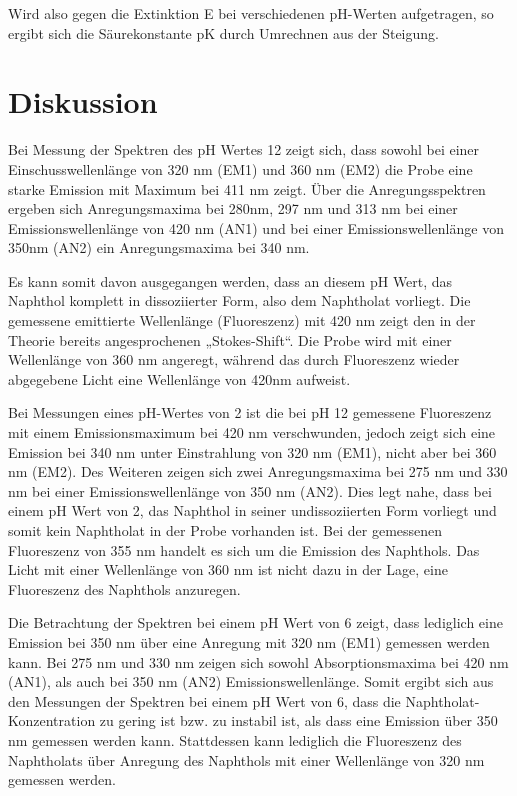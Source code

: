 \documentclass[12pt]{article}
\begin{document}
Wird also gegen die Extinktion E bei verschiedenen pH-Werten aufgetragen,
so ergibt sich die Säurekonstante pK durch Umrechnen aus der Steigung. 

\section{Diskussion}

Bei Messung der Spektren des pH Wertes 12 zeigt sich, dass sowohl bei einer Einschusswellenlänge von 320 nm (EM1) und
360 nm (EM2) die Probe eine starke Emission mit Maximum bei 411 nm zeigt. Über die Anregungsspektren
ergeben sich Anregungsmaxima bei 280nm, 297 nm und 313 nm bei einer Emissionswellenlänge von 420 nm (AN1)
und bei einer Emissionswellenlänge von 350nm (AN2) ein Anregungsmaxima bei 340 nm.

Es kann somit davon ausgegangen werden, dass an diesem pH Wert, das Naphthol komplett in dissoziierter Form, also dem Naphtholat vorliegt.
Die gemessene emittierte Wellenlänge (Fluoreszenz) mit 420 nm zeigt den in der Theorie bereits angesprochenen „Stokes-Shift“.
Die Probe wird mit einer Wellenlänge von 360 nm angeregt, während das durch Fluoreszenz wieder abgegebene
Licht eine Wellenlänge von 420nm aufweist.


Bei Messungen eines pH-Wertes von 2 ist die bei pH 12 gemessene Fluoreszenz mit einem Emissionsmaximum bei 420 nm verschwunden,
jedoch zeigt sich eine Emission bei 340 nm unter Einstrahlung von 320 nm (EM1), nicht aber bei 360 nm (EM2).
Des Weiteren zeigen sich zwei Anregungsmaxima bei 275 nm und 330 nm bei einer Emissionswellenlänge von 350 nm (AN2).
Dies legt nahe, dass bei einem pH Wert von 2, das Naphthol in seiner undissoziierten Form vorliegt
und somit kein Naphtholat in der Probe vorhanden ist. Bei der gemessenen Fluoreszenz von 355 nm handelt
es sich um die Emission des Naphthols. Das Licht mit einer Wellenlänge von 360 nm ist nicht dazu in der Lage,
eine Fluoreszenz des Naphthols anzuregen.


Die Betrachtung der Spektren bei einem pH Wert von 6 zeigt, dass lediglich eine Emission bei 350 nm
über eine Anregung mit 320 nm (EM1) gemessen werden kann. Bei 275 nm und 330 nm zeigen sich sowohl Absorptionsmaxima bei 420 nm (AN1), als auch bei 350 nm (AN2) Emissionswellenlänge.
Somit ergibt sich aus den Messungen der Spektren bei einem pH Wert von 6,
dass die Naphtholat-Konzentration zu gering ist bzw. zu instabil ist,
als dass eine Emission über 350 nm gemessen werden kann.
Stattdessen kann lediglich die Fluoreszenz des Naphtholats
über Anregung des Naphthols mit einer Wellenlänge von 320 nm gemessen werden.
\end{document}
